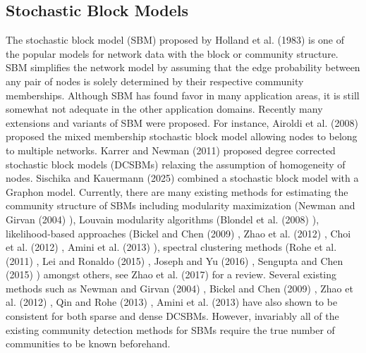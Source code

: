 \documentclass[11pt]{article}
\begin{document}
\subsection{Stochastic Block Models} The stochastic block model (SBM) proposed by Holland et al. (1983) \cite{holland83} is one of the popular models for network data with the block or community structure. SBM simplifies the network model by assuming that the edge probability between any pair of nodes is solely determined by their respective community memberships. Although SBM has found favor in many application areas, it is still somewhat not adequate in the other application domains. Recently many extensions and variants of SBM were proposed. For instance, Airoldi et al. (2008) \cite{airoldi2008} proposed the mixed membership stochastic block model allowing nodes to belong to multiple networks. Karrer and Newman (2011) \cite{karrer2011} proposed degree corrected stochastic block models (DCSBMs) relaxing the assumption of homogeneity of nodes. Sischika and Kauermann (2025) \cite{sischika2025} combined a stochastic block model with a Graphon model. Currently, there are many existing methods for estimating the community structure of SBMs including modularity maximization (Newman and Girvan (2004) \cite{newman04}), Louvain modularity algorithms (Blondel et al. (2008) \cite{blondel2008}), likelihood-based approaches (Bickel and Chen (2009) \cite{bickel09}, Zhao et al. (2012) \cite{zhao12}, Choi et al. (2012) \cite{choi2012}, Amini et al. (2013) \cite{amini2013}), spectral clustering methods (Rohe et al. (2011) \cite{rohe11}, Lei and Ronaldo (2015) \cite{lei2015}, Joseph and Yu (2016) \cite{joseph2016}, Sengupta and Chen (2015) \cite{sengupta2015}) amongst others, see Zhao et al. (2017) \cite{zhao17} for a review. Several existing methods such as Newman and Girvan (2004) \cite{newman04}, Bickel and Chen (2009) \cite{bickel09}, Zhao et al. (2012) \cite{zhao12}, Qin and Rohe (2013) \cite{qin2013}, Amini et al. (2013) \cite{amini2013} have also shown to be consistent for both sparse and dense DCSBMs. However, invariably all of the existing community detection methods for SBMs require the true number of communities to be known beforehand.
\end{document}
